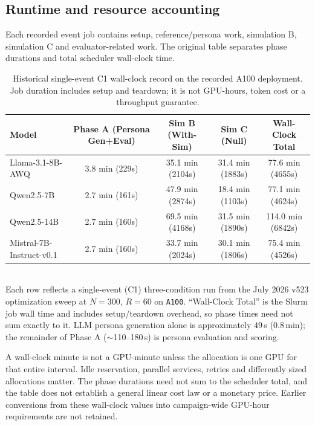 \subsection{Runtime and resource accounting}
\label{sec:runtime_breakdown}
Each recorded event job contains setup, reference/persona work, simulation B, simulation C and evaluator-related work. The original table separates phase durations and total scheduler wall-clock time.
\begin{table}[!htbp]
\centering
\caption{Historical single-event C1 wall-clock record on the recorded A100 deployment. Job duration includes setup and teardown; it is not GPU-hours, token cost or a throughput guarantee.}
\label{tab:runtime_breakdown}
\footnotesize
\setlength{\tabcolsep}{4pt}
\begin{tabular}{lcccc}
\toprule
\textbf{Model} & \textbf{Phase A (Persona Gen+Eval)} & \textbf{Sim B (With-Sim)} & \textbf{Sim C (Null)} & \textbf{Wall-Clock Total} \\
\midrule
Llama-3.1-8B-AWQ  & 3.8 min (229s)   & 35.1 min (2104s) & 31.4 min (1883s) & 77.6 min (4655s) \\
Qwen2.5-7B    & 2.7 min (161s)   & 47.9 min (2874s) & 18.4 min (1103s) & 77.1 min (4624s) \\
Qwen2.5-14B   & 2.7 min (160s)   & 69.5 min (4168s) & 31.5 min (1890s) & 114.0 min (6842s) \\
Mistral-7B-Instruct-v0.1    & 2.7 min (160s)   & 33.7 min (2024s) & 30.1 min (1806s) & 75.4 min (4526s) \\
\bottomrule
\end{tabular}
\smallskip \\
\footnotesize Each row reflects a single-event (C1) three-condition run from the July 2026 v523 optimization sweep at $N=300$, $R=60$ on \texttt{A100}. ``Wall-Clock Total'' is the Slurm job wall time and includes setup/teardown overhead, so phase times need not sum exactly to it. LLM persona generation alone is approximately $49$\,s ($0.8$\,min); the remainder of Phase A ($\sim$110--180\,s) is persona evaluation and scoring.
\end{table}
A wall-clock minute is not a GPU-minute unless the allocation is one GPU for that entire interval. Idle reservation, parallel services, retries and differently sized allocations matter. The phase durations need not sum to the scheduler total, and the table does not establish a general linear cost law or a monetary price. Earlier conversions from these wall-clock values into campaign-wide GPU-hour requirements are not retained.

